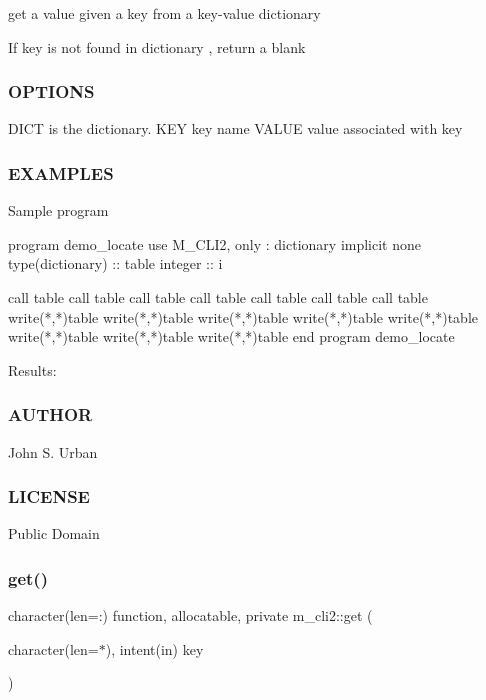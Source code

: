 \begin{DoxyVerb}get a value given a key from a key-value dictionary

If key is not found in dictionary , return a blank
\end{DoxyVerb}


\subsubsection*{O\+P\+T\+I\+O\+NS}

\begin{DoxyVerb}DICT     is the dictionary.
KEY      key name
VALUE    value associated with key
\end{DoxyVerb}


\subsubsection*{E\+X\+A\+M\+P\+L\+ES}

Sample program \begin{DoxyVerb}program demo_locate
use M_CLI2, only : dictionary
implicit none
type(dictionary)             :: table
integer          :: i

call table%
call table%
call table%
call table%
call table%
call table%
call table%
write(*,*)table%
write(*,*)table%
write(*,*)table%
write(*,*)table%
write(*,*)table%
write(*,*)table%
write(*,*)table%
write(*,*)table%
end program demo_locate
\end{DoxyVerb}


Results\+:

\subsubsection*{A\+U\+T\+H\+OR}

John S. Urban \subsubsection*{L\+I\+C\+E\+N\+SE}

Public Domain \mbox{\label{namespacem__cli2_aa92e8ad0300d4e324e29eae1ab9d04b4}} 
\subsubsection{\texorpdfstring{get()}{get()}}
{\footnotesize\ttfamily character(len=\+:) function, allocatable, private m\+\_\+cli2\+::get (\begin{DoxyParamCaption}\item[{character(len=$\ast$), intent(in)}]{key }\end{DoxyParamCaption})\hspace{0.3cm}{\ttfamily [private]}}



